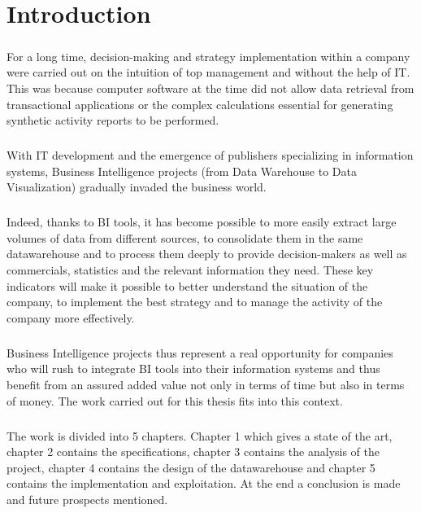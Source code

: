 \chapter * {Introduction}

\paragraph {}
For a long time, decision-making and strategy implementation within a company were carried out on the intuition of top management and without the help of IT. This was because computer software at the time did not allow data retrieval from transactional applications or the complex calculations essential for generating synthetic activity reports to be performed.
\paragraph {}
With IT development and the emergence of publishers specializing in information systems, Business Intelligence projects (from Data Warehouse to Data Visualization) gradually invaded the business world.
\paragraph {}
Indeed, thanks to BI tools, it has become possible to more easily extract large volumes of data from different sources, to consolidate them in the same datawarehouse and to process them deeply to provide decision-makers as well as commercials, statistics and the relevant information they need. These key indicators will make it possible to better understand the situation of the company, to implement the best strategy and to manage the activity of the company more effectively.
\paragraph {}
Business Intelligence projects thus represent a real opportunity for companies who will rush to integrate BI tools into their information systems and thus benefit from an assured added value not only in terms of time but also in terms of money. The work carried out for this thesis fits into this context.
\paragraph {}
The work is divided into 5 chapters. Chapter 1 which gives a state of the art, chapter 2 contains the specifications, chapter 3 contains the analysis of the project, chapter 4 contains the design of the datawarehouse and chapter 5 contains the implementation and exploitation. At the end a conclusion is made and future prospects mentioned.